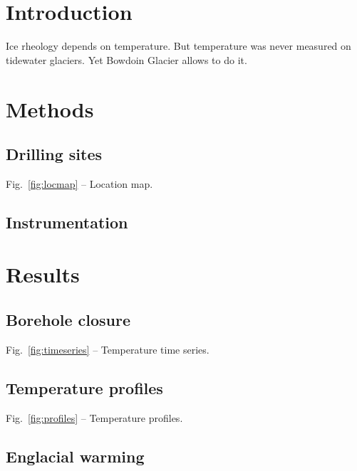 \documentclass{article}
\begin{document}
\section{Introduction}

    Ice rheology depends on temperature. But temperature was never measured on
    tidewater glaciers. Yet Bowdoin Glacier allows to do it.


\section{Methods}

\subsection{Drilling sites}
    Fig.~\ref{fig:locmap} -- Location map.

\subsection{Instrumentation}


\section{Results}

\subsection{Borehole closure}
    Fig.~\ref{fig:timeseries} -- Temperature time series.

\subsection{Temperature profiles}
    Fig.~\ref{fig:profiles} -- Temperature profiles.

\subsection{Englacial warming}


\end{document}

